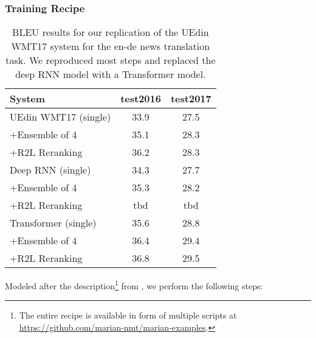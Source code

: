 \documentclass[11pt,a4paper]{article}
\begin{document}
\subsubsection{Training Recipe}

\begin{table}[t]
\centering
\begin{tabular}{lcc}\toprule
System &	test2016 &	test2017 \\ \midrule
UEdin WMT17 (single) & 33.9 & 27.5 \\ 
+Ensemble of 4 & 35.1 & 28.3 \\ 
+R2L Reranking & 36.2 &	28.3 \\ \midrule \midrule
Deep RNN (single) & 34.3 & 27.7 \\ 
+Ensemble of 4 & 35.3 & 28.2 \\ 
+R2L Reranking & tbd & tbd \\ \midrule
Transformer (single) &	35.6 &	28.8 \\
+Ensemble of 4 &	36.4 &	29.4 \\ 
+R2L Reranking &	36.8 &	29.5 \\ \bottomrule
\end{tabular}
\caption{BLEU results for our replication of the UEdin WMT17 system for the en-de news translation task.
We reproduced most steps and replaced the deep RNN model with a Transformer model.}
\label{wmt-bleu}
\end{table}

Modeled after the description\footnote{The entire recipe is available in form of multiple scripts at \url{https://github.com/marian-nmt/marian-examples}.} from , we perform the following steps:
\end{document}
